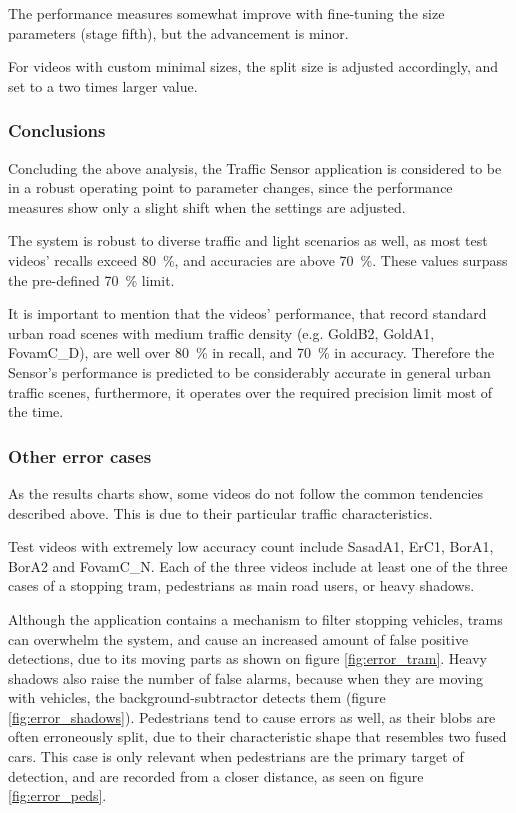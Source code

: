 The performance measures somewhat improve with fine-tuning the size parameters (stage fifth), but the advancement is minor.

For videos with custom minimal sizes, the split size is adjusted accordingly, and set to a two times larger value.

\subsubsection{Conclusions}
Concluding the above analysis, the Traffic Sensor application is considered to be in a robust operating point to parameter changes, since the performance measures show only a slight shift when the settings are adjusted.

The system is robust to diverse traffic and light scenarios as well, as most test videos' recalls exceed \SI{80}{\%}, and accuracies are above \SI{70}{\%}. These values surpass the pre-defined \SI{70}{\%} limit.

It is important to mention that the videos' performance, that record standard urban road scenes with medium traffic density (e.g. GoldB2, GoldA1, FovamC\_D), are well over \SI{80}{\%} in recall, and \SI{70}{\%} in accuracy.
Therefore the Sensor's performance is predicted to be considerably accurate in general urban traffic scenes, furthermore, it operates over the required precision limit most of the time.

\subsubsection{Other error cases}
As the results charts show, some videos do not follow the common tendencies described above.
This is due to their particular traffic characteristics.

Test videos with extremely low accuracy count include SasadA1, ErC1, BorA1, BorA2 and FovamC\_N.
Each of the three videos include at least one of the three cases of a stopping tram, pedestrians as main road users, or heavy shadows.

Although the application contains a mechanism to filter stopping vehicles, trams can overwhelm the system, and cause an increased amount of false positive detections, due to its moving parts as shown on figure \ref{fig:error_tram}.
Heavy shadows also raise the number of false alarms, because when they are moving with vehicles, the background-subtractor detects them (figure \ref{fig:error_shadows}).
Pedestrians tend to cause errors as well, as their blobs are often erroneously split, due to their characteristic shape that resembles two fused cars.
This case is only relevant when pedestrians are the primary target of detection, and are recorded from a closer distance, as seen on figure \ref{fig:error_peds}.

